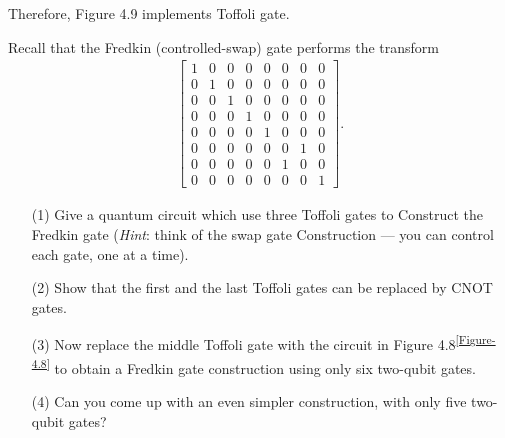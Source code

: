 \documentclass[en]{sol-man}
\begin{document}
\begin{pf}
    Therefore, Figure 4.9 implements Toffoli gate.
\end{pf}

\begin{exe}
    Recall that the Fredkin (controlled-swap) gate performs the transform
    \begin{align}
        \begin{bmatrix}
            1&0&0&0&0&0&0&0\\
            0&1&0&0&0&0&0&0\\
            0&0&1&0&0&0&0&0\\
            0&0&0&1&0&0&0&0\\
            0&0&0&0&1&0&0&0\\
            0&0&0&0&0&0&1&0\\
            0&0&0&0&0&1&0&0\\
            0&0&0&0&0&0&0&1
        \end{bmatrix}.
    \end{align}
    \begin{itemize}
        \item[(1)] Give a quantum circuit which use three Toffoli gates to Construct the Fredkin gate (\emph{Hint}: think of the swap gate Construction --- you can control each gate, one at a time).
        \item[(2)] Show that the first and the last Toffoli gates can be replaced by CNOT gates.
        \item[(3)] Now replace the middle Toffoli gate with the circuit in Figure 4.8\textsuperscript{\ref{Figure-4.8}} to obtain a Fredkin gate construction using only six two-qubit gates.
        \item[(4)] Can you come up with an even simpler construction, with only five two-qubit gates?
    \end{itemize}
\end{exe}
\begin{sol}
    
\end{sol}
\end{document}

